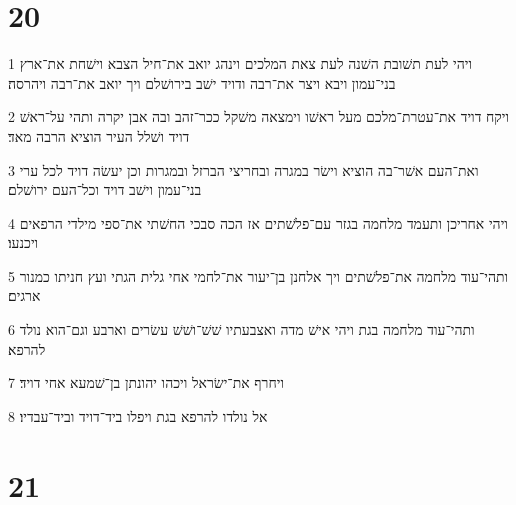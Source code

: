 \chapter{20}

\par 1 ויהי לעת תשׁובת השׁנה לעת צאת המלכים וינהג יואב את־חיל הצבא וישׁחת את־ארץ בני־עמון ויבא ויצר את־רבה ודויד ישׁב בירושׁלם ויך יואב את־רבה ויהרסה׃
\par 2 ויקח דויד את־עטרת־מלכם מעל ראשׁו וימצאה משׁקל ככר־זהב ובה אבן יקרה ותהי על־ראשׁ דויד ושׁלל העיר הוציא הרבה מאד׃
\par 3 ואת־העם אשׁר־בה הוציא וישׂר במגרה ובחריצי הברזל ובמגרות וכן יעשׂה דויד לכל ערי בני־עמון וישׁב דויד וכל־העם ירושׁלם׃
\par 4 ויהי אחריכן ותעמד מלחמה בגזר עם־פלשׁתים אז הכה סבכי החשׁתי את־ספי מילדי הרפאים ויכנעו׃
\par 5 ותהי־עוד מלחמה את־פלשׁתים ויך אלחנן בן־יעור את־לחמי אחי גלית הגתי ועץ חניתו כמנור ארגים׃
\par 6 ותהי־עוד מלחמה בגת ויהי אישׁ מדה ואצבעתיו שׁשׁ־ושׁשׁ עשׂרים וארבע וגם־הוא נולד להרפא׃
\par 7 ויחרף את־ישׂראל ויכהו יהונתן בן־שׁמעא אחי דויד׃
\par 8 אל נולדו להרפא בגת ויפלו ביד־דויד וביד־עבדיו׃

\chapter{21}

